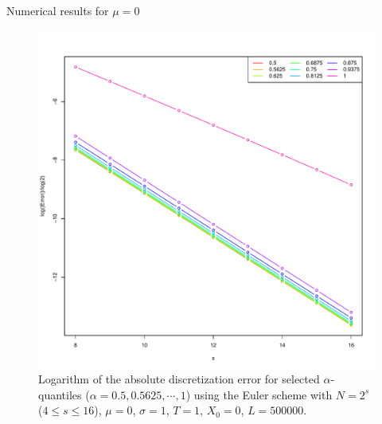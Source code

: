 \documentclass[cjk,10pt]{beamer}
\begin{document}
\begin{frame}{Numerical results for $\mu=0$}
 \begin{figure}
   \includegraphics[scale=0.3]{nout_0alog.pdf}
   \caption{Logarithm of the absolute discretization error for selected $\alpha$-quantiles ($\alpha = 0.5, 0.5625, \cdots, 1$) using the Euler scheme with $N = 2^s$ ($4\le s \le 16$), $\mu=0$, $\sigma=1$, $T=1$, $X_0=0$, $L=500000$.} 
   \label{f:lab}
\end{figure}
\end{frame}
\end{document}
